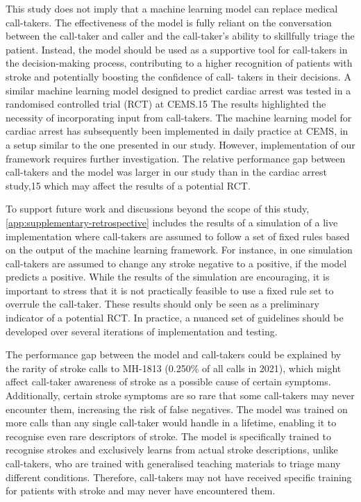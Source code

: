 {This study does not imply that a machine learning model can replace medical call-takers. The effectiveness of the model is fully reliant on the conversation between the call-taker and caller and the call-taker's ability to skillfully triage the patient. Instead, the model should be used as a supportive tool for call-takers in the decision-making process, contributing to a higher recognition of patients with stroke and potentially boosting the confidence of call- takers in their decisions. A similar machine learning model designed to predict cardiac arrest was tested in a randomised controlled trial (RCT) at CEMS.15 The results highlighted the necessity of incorporating input from call-takers. The machine learning model for cardiac arrest has subsequently been implemented in daily practice at CEMS, in a setup similar to the one presented in our study. However, implementation of our framework requires further investigation. The relative performance gap between call-takers and the model was larger in our study than in the cardiac arrest study,15 which may affect the results of a potential RCT. 

To support future work and discussions beyond the scope of this study, \cref{app:supplementary-retrospective} includes the results of a simulation of a live implementation where call-takers are assumed to follow a set of fixed rules based on the output of the machine learning framework.
For instance, in one simulation call-takers are assumed to change any stroke negative to a positive, if the model predicts a positive. While the results of the simulation are encouraging, it is important to stress that it is not practically feasible to use a fixed rule set to overrule the call-taker. These results should only be seen as a preliminary indicator of a potential RCT. In practice, a nuanced set of guidelines should be developed over several iterations of implementation and testing.

The performance gap between the model and call-takers could be explained by the rarity of stroke calls to MH-1813 (0.250\% of all calls in 2021), which might affect call-taker awareness of stroke as a possible cause of certain symptoms. Additionally, certain stroke symptoms are so rare that some call-takers may never encounter them, increasing the risk of false negatives. The model was trained on more calls than any single call-taker would handle in a lifetime, enabling it to recognise even rare descriptors of stroke. The model is specifically trained to recognise strokes and exclusively learns from actual stroke descriptions, unlike call-takers, who are trained with generalised teaching materials to triage many different conditions. Therefore, call-takers may not have received specific training for patients with stroke and may never have encountered them.

}
